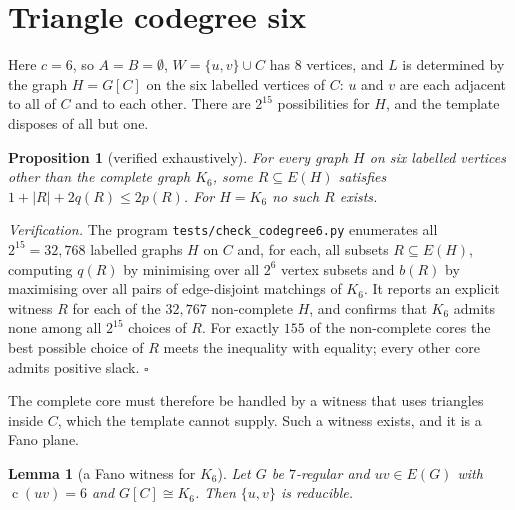 \documentclass[11pt,a4paper]{amsart}
\theoremstyle{plain}
\newtheorem{lemma}[theorem]{Lemma}
\newtheorem{proposition}[theorem]{Proposition}
\theoremstyle{definition}
\newcommand{\cod}{\operatorname{c}}
\begin{document}
\section{Triangle codegree six}\label{sec:codeg6}

Here $c=6$, so $A=B=\emptyset$, $W=\{u,v\}\cup C$ has $8$ vertices, and $L$ is
determined by the graph $H=G[C]$ on the six labelled vertices of $C$: $u$ and
$v$ are each adjacent to all of $C$ and to each other. There are $2^{15}$
possibilities for $H$, and the template disposes of all but one.

\begin{proposition}[verified exhaustively]\label{prop:template6}
For every graph $H$ on six labelled vertices other than the complete graph
$K_6$, some $R\subseteq E(H)$ satisfies $1+|R|+2q(R)\le 2p(R)$. For $H=K_6$
no such $R$ exists.
\end{proposition}

\emph{Verification.} The program \texttt{tests/check\_codegree6.py} enumerates
all $2^{15}=32{,}768$ labelled graphs $H$ on $C$ and, for each, all subsets
$R\subseteq E(H)$, computing $q(R)$ by minimising over all $2^6$ vertex
subsets and $b(R)$ by maximising over all pairs of edge-disjoint matchings of
$K_6$. It reports an explicit witness $R$ for each of the $32{,}767$
non-complete $H$, and confirms that $K_6$ admits none among all $2^{15}$
choices of $R$. For exactly $155$ of the non-complete cores the best possible
choice of $R$ meets the inequality with equality; every other core admits
positive slack.
\hfill$\square$

The complete core must therefore be handled by a witness that uses triangles
inside $C$, which the template cannot supply. Such a witness exists, and it is
a Fano plane.

\begin{lemma}[a Fano witness for $K_6$]\label{lem:fano6}
Let $G$ be $7$-regular and $uv\in E(G)$ with $\cod(uv)=6$ and $G[C]\cong K_6$.
Then $\{u,v\}$ is reducible.
\end{lemma}
\end{document}
